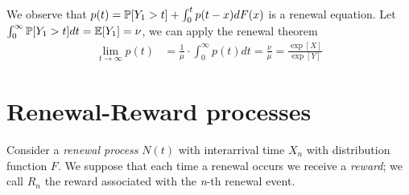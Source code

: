 	We observe that $p(t)= \mathbb{P}[Y_1>t]+\int_0^t p(t-x)dF(x)$ is a renewal equation. Let $\int_0^{\infty}\mathbb{P}[Y_1>t]dt=\mathbb{E}[Y_1]=\nu$, we can apply the renewal theorem
	\begin{align*}
		\lim_{t \to \infty} p(t) & = \frac{1}{\mu}\cdot\int_0^{\infty}p(t)dt = \frac{\nu}{\mu}= \frac{\exp[X]}{\exp[Y]}
	\end{align*}

\section{Renewal-Reward processes}
Consider a \textit{renewal process} $N(t)$ with interarrival time $X_n$ with distribution function $F$. We suppose that each time a renewal occurs we receive a \textit{reward}; we call $R_n$ the reward associated with the \emph{n}-th renewal event.

